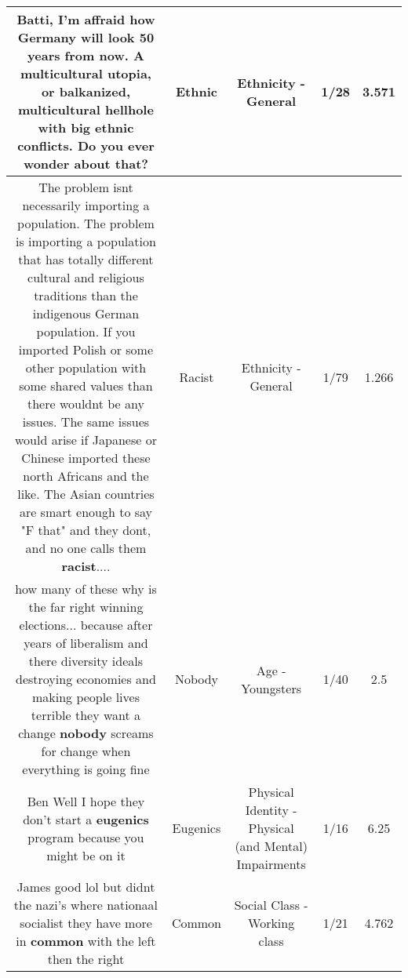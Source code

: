 \documentclass[11pt]{article}
\newlength\mylength
\begin{document}
\begin{center}
\begin{longtable}{|C{.65\mylength}|C{.30\mylength}|C{.12\mylength}|C{.12\mylength}|C{.12\mylength}|}
  \small Batti, I'm affraid how Germany will look 50 years from now. A multicultural utopia, or balkanized,  multicultural hellhole with big \textbf{ethnic} conflicts. Do you ever wonder about that?\normalsize   & Ethnic & Ethnicity - General & 1/28 & 3.571 \\  \hline
  \small The problem isnt necessarily importing a population. The problem is importing a population that has totally different cultural and religious traditions than the indigenous German population. If you imported Polish or some other population with some shared values than there wouldnt be any issues. The same issues would arise if Japanese or Chinese imported these north Africans and the like. The Asian countries are smart enough to say "F that" and they dont, and no one calls them \textbf{racist}....\normalsize   & Racist & Ethnicity - General & 1/79 & 1.266 \\  \hline
  \small how many of these why is the far right winning elections... because after years of liberalism and there diversity ideals destroying economies and making people lives terrible they want a change \textbf{nobody} screams for change when everything is going fine\normalsize   & Nobody & Age - Youngsters & 1/40 & 2.5 \\  \hline
  \small Ben Well I hope they don't start a \textbf{eugenics} program because you might be on it\normalsize   & Eugenics & Physical Identity - Physical (and Mental) Impairments & 1/16 & 6.25 \\  \hline
  \small James good lol but didnt the nazi's where nationaal socialist they have more in \textbf{common} with the left then the right\normalsize   & Common & Social Class - Working class & 1/21 & 4.762 \\  \hline

\end{longtable}
\end{center}
\end{document}
